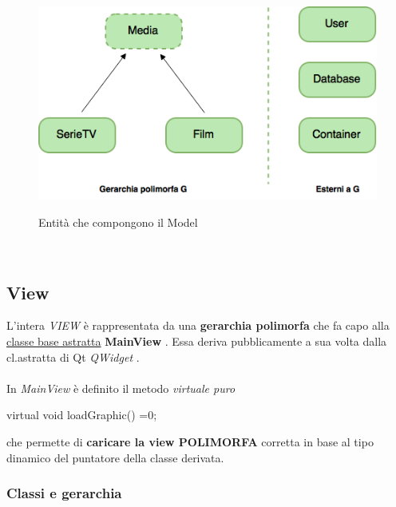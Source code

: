 \documentclass[10pt,a4paper,openany]{article}
\begin{document}
	
		\begin{figure}
			\centering
			\includegraphics[angle=0,scale=.60]{Model.png}\\
			\caption{Entità che compongono il Model}
			\label{fig:Model}
		\end{figure}
		
	\newpage
	\ \vspace{25pt}
	
	
	
	\subsection{View}
	\label{sec:view}
	
	L'intera \emph{VIEW} è rappresentata da una \textbf{gerarchia polimorfa} che fa capo alla \underline{classe base astratta} \textbf{MainView} .
	Essa deriva pubblicamente a sua volta dalla cl.astratta di Qt \emph{QWidget} .\\\\
	In \emph{MainView} è definito il metodo \textit{virtuale puro} 
	\begin{CPP}
		virtual void loadGraphic() =0;
	\end{CPP}
	che permette di \textbf{caricare la view POLIMORFA} corretta in base al tipo dinamico del puntatore della classe derivata.
	
		\subsubsection{Classi e gerarchia }
\end{document}
